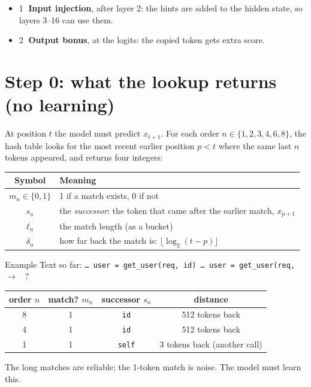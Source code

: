 \documentclass[11pt]{article}
\begin{document}
\begin{itemize}
  \item \textcircled{1} \textbf{Input injection}, after layer 2: the hints are added to the hidden state, so layers 3--16 can use them.
  \item \textcircled{2} \textbf{Output bonus}, at the logits: the copied token gets extra score.
\end{itemize}

\section{Step 0: what the lookup returns (no learning)}

At position $t$ the model must predict $x_{t+1}$. For each order $n \in \{1,2,3,4,6,8\}$, the hash table looks for the most recent earlier position $p < t$ where the same last $n$ tokens appeared, and returns four integers:

\begin{center}
\begin{tabular}{@{}cl@{}}
\toprule
Symbol & Meaning \\
\midrule
$m_n \in \{0,1\}$ & 1 if a match exists, 0 if not \\
$s_n$ & the \emph{successor}: the token that came after the earlier match, $x_{p+1}$ \\
$\ell_n$ & the match length (as a bucket) \\
$\delta_n$ & how far back the match is: $\lfloor \log_2(t-p) \rfloor$ \\
\bottomrule
\end{tabular}
\end{center}

\begin{example}{Example}
Text so far: \quad \texttt{\dots\ user = get\_user(req, id) \dots\ user = get\_user(req,} \quad $\to$ \ ?

\begin{center}
\begin{tabular}{@{}cccc@{}}
\toprule
order $n$ & match? $m_n$ & successor $s_n$ & distance \\
\midrule
8 & 1 & \texttt{id} & 512 tokens back \\
4 & 1 & \texttt{id} & 512 tokens back \\
1 & 1 & \texttt{self} & 3 tokens back (another call) \\
\bottomrule
\end{tabular}
\end{center}
The long matches are reliable; the 1-token match is noise. The model must learn this.
\end{example}
\end{document}
